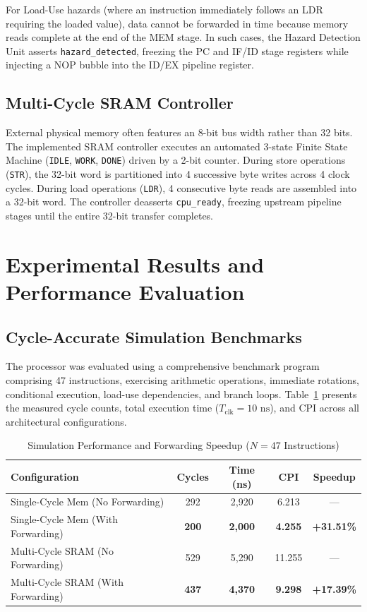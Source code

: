 \documentclass[conference]{IEEEtran}
\begin{document}
For Load-Use hazards (where an instruction immediately follows an LDR requiring the loaded value), data cannot be forwarded in time because memory reads complete at the end of the MEM stage. In such cases, the Hazard Detection Unit asserts \texttt{hazard\_detected}, freezing the PC and IF/ID stage registers while injecting a NOP bubble into the ID/EX pipeline register.

\subsection{Multi-Cycle SRAM Controller}
External physical memory often features an 8-bit bus width rather than 32 bits. The implemented SRAM controller executes an automated 3-state Finite State Machine (\texttt{IDLE}, \texttt{WORK}, \texttt{DONE}) driven by a 2-bit counter. During store operations (\texttt{STR}), the 32-bit word is partitioned into 4 successive byte writes across 4 clock cycles. During load operations (\texttt{LDR}), 4 consecutive byte reads are assembled into a 32-bit word. The controller deasserts \texttt{cpu\_ready}, freezing upstream pipeline stages until the entire 32-bit transfer completes.

\section{Experimental Results and Performance Evaluation}
\subsection{Cycle-Accurate Simulation Benchmarks}
The processor was evaluated using a comprehensive benchmark program comprising 47 instructions, exercising arithmetic operations, immediate rotations, conditional execution, load-use dependencies, and branch loops. Table~\ref{tab:benchmarks} presents the measured cycle counts, total execution time ($T_{\text{clk}} = 10\text{ ns}$), and CPI across all architectural configurations.

\begin{table}[htbp]
\caption{Simulation Performance and Forwarding Speedup ($N=47$ Instructions)}
\label{tab:benchmarks}
\centering
\begin{tabular}{lcccc}
\toprule
\textbf{Configuration} & \textbf{Cycles} & \textbf{Time (ns)} & \textbf{CPI} & \textbf{Speedup} \\
\midrule
Single-Cycle Mem (No Forwarding) & 292 & 2,920 & 6.213 & --- \\
Single-Cycle Mem (With Forwarding) & \textbf{200} & \textbf{2,000} & \textbf{4.255} & \textbf{+31.51\%} \\
Multi-Cycle SRAM (No Forwarding) & 529 & 5,290 & 11.255 & --- \\
Multi-Cycle SRAM (With Forwarding) & \textbf{437} & \textbf{4,370} & \textbf{9.298} & \textbf{+17.39\%} \\
\bottomrule
\end{tabular}
\end{table}
\end{document}
